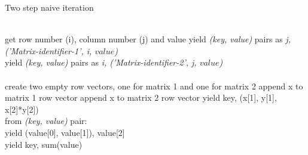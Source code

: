 \documentclass[10pt,onecolumn]{article}
\begin{document}
\begin{algorithm}
\caption{Two step naive iteration}\label{2step}
\begin{algorithmic}[1]
 \\
\State get row number (i), column number (j) and value
\State yield \textit{(key, value)} pairs as \textit{ j, ('Matrix-identifier-1', i, $value$)} \\
\EndFor
\EndIf
{} 
\State yield \textit{(key, value)} pairs as \textit{i, ('Matrix-identifier-2', j, $value$)} \\
\EndFor
\EndIf
\EndProcedure
{} \\
create two empty row vectors, one for matrix 1 and one for matrix 2
\State append x to matrix 1 row vector
\Else 
\State append x to matrix 2 row vector
\EndIf
\EndFor
{}
 yield key, (x[1], y[1], x[2]*y[2])
\EndFor
\EndFor
\EndProcedure
{}\\
from \textit{(key, value)} pair: \\
yield (value[0], value[1]), value[2]
\EndProcedure
{}\\
yield key, sum(value)
\EndProcedure
\end{algorithmic}
\end{algorithm}
\end{document}
